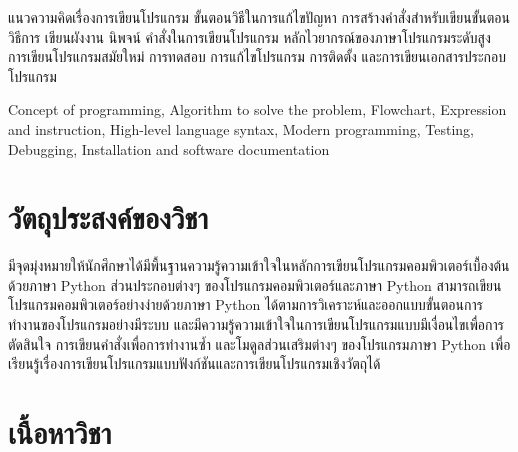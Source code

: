 \begin{tcolorbox}[breakable,enhanced,fonttitle=\bfseries,colback=myblue!05,colframe=myblue]
แนวความคิดเรื่องการเขียนโปรแกรม ขั้นตอนวิธีในการแก้ไขปัญหา การสร้างคำสั่งสำหรับเขียนขั้นตอนวิธีการ เขียนผังงาน นิพจน์ คำสั่งในการเขียนโปรแกรม หลักไวยากรณ์ของภาษาโปรแกรมระดับสูง การเขียนโปรแกรมสมัยใหม่ การทดสอบ การแก้ไขโปรแกรม การติดตั้ง และการเขียนเอกสารประกอบโปรแกรม

Concept of programming, Algorithm to solve the problem, Flowchart, Expression and instruction, High-level language syntax, Modern programming, Testing, Debugging, Installation and software documentation
\end{tcolorbox}

\section*{วัตถุประสงค์ของวิชา}

\begin{tcolorbox}[breakable,enhanced,fonttitle=\bfseries,colback=myblue!05,colframe=myblue]
มีจุดมุ่งหมายให้นักศึกษาได้มีพื้นฐานความรู้ความเข้าใจในหลักการเขียนโปรแกรมคอมพิวเตอร์เบื้องต้นด้วยภาษา Python ส่วนประกอบต่างๆ ของโปรแกรมคอมพิวเตอร์และภาษา Python สามารถเขียนโปรแกรมคอมพิวเตอร์อย่างง่ายด้วยภาษา Python ได้ตามการวิเคราะห์และออกแบบขั้นตอนการทำงานของโปรแกรมอย่างมีระบบ และมีความรู้ความเข้าใจในการเขียนโปรแกรมแบบมีเงื่อนไขเพื่อการตัดสินใจ การเขียนคำสั่งเพื่อการทำงานซ้ำ และโมดูลส่วนเสริมต่างๆ ของโปรแกรมภาษา Python เพื่อเรียนรู้เรื่องการเขียนโปรแกรมแบบฟังก์ชันและการเขียนโปรแกรมเชิงวัตถุได้
\end{tcolorbox}
\vspace{1.5cm}

\section*{เนื้อหาวิชา}



